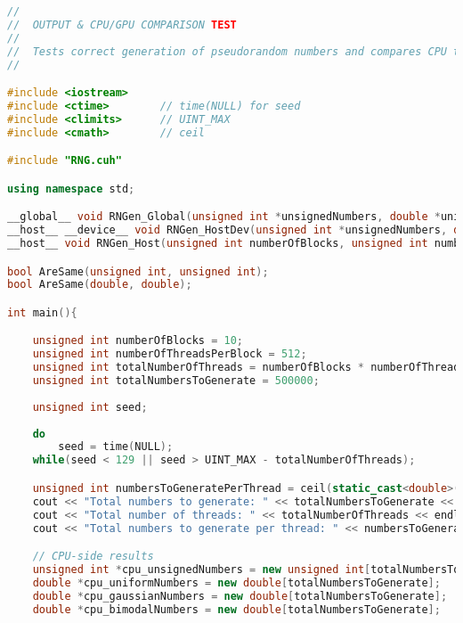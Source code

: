 \begin{lstlisting}[language=C++, caption={\texttt{libraries/CoreLibraries/RandomGenerator/OutputTest.cu}}]
//
//	OUTPUT & CPU/GPU COMPARISON TEST
//
//	Tests correct generation of pseudorandom numbers and compares CPU to GPU output with same seed.
//

#include <iostream>
#include <ctime>		// time(NULL) for seed
#include <climits>		// UINT_MAX
#include <cmath>		// ceil

#include "RNG.cuh"

using namespace std;

__global__ void RNGen_Global(unsigned int *unsignedNumbers, double *uniformNumbers, double *gaussianNumbers, double *bimodalNumbers, unsigned int totalNumbersToGenerate, unsigned int numbersToGeneratePerThread, unsigned int seed);
__host__ __device__ void RNGen_HostDev(unsigned int *unsignedNumbers, double *uniformNumbers, double *gaussianNumbers, double *bimodalNumbers, unsigned int totalNumbersToGenerate, unsigned int numbersToGeneratePerThread, unsigned int seed, unsigned int threadNumber);
__host__ void RNGen_Host(unsigned int numberOfBlocks, unsigned int numberOfThreadsPerBlock, unsigned int *unsignedNumbers, double *uniformNumbers, double *gaussianNumbers, double *bimodalNumbers, unsigned int totalNumbersToGenerate, unsigned int numbersToGeneratePerThread, unsigned int seed);

bool AreSame(unsigned int, unsigned int);
bool AreSame(double, double);

int main(){

	unsigned int numberOfBlocks = 10;
	unsigned int numberOfThreadsPerBlock = 512;
	unsigned int totalNumberOfThreads = numberOfBlocks * numberOfThreadsPerBlock;
	unsigned int totalNumbersToGenerate = 500000;
	
	unsigned int seed;	
	
	do
		seed = time(NULL);
	while(seed < 129 || seed > UINT_MAX - totalNumberOfThreads);

	unsigned int numbersToGeneratePerThread = ceil(static_cast<double>(totalNumbersToGenerate) / totalNumberOfThreads);
	cout << "Total numbers to generate: " << totalNumbersToGenerate << endl;
	cout << "Total number of threads: " << totalNumberOfThreads << endl;
	cout << "Total numbers to generate per thread: " << numbersToGeneratePerThread << endl;

	// CPU-side results
	unsigned int *cpu_unsignedNumbers = new unsigned int[totalNumbersToGenerate];
	double *cpu_uniformNumbers = new double[totalNumbersToGenerate];
	double *cpu_gaussianNumbers = new double[totalNumbersToGenerate];
	double *cpu_bimodalNumbers = new double[totalNumbersToGenerate];


\end{lstlisting}

